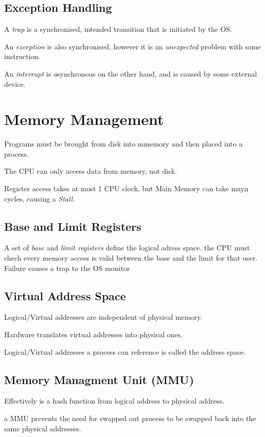 \documentclass{article}
\begin{document}
\subsection{Exception Handling}

A \textit{trap} is a synchronised, intended transition that is initiated by the OS.

An \textit{exception} is also synchronised, however it is an \textit{unexpected} problem with some instruction.

An \textit{interrupt} is \textit{a}synchronous on the other hand, and is caused by some external device.

\filbreak
\section{Memory Management}
Programs must be brought from disk into mmemory and then placed into a process.

The CPU can only access data from memory, not disk.

Register access takes at most 1 CPU clock, but Main Memory can take mayn cycles, causing a \emph{Stall}.

\subsection{Base and Limit Registers}
A set of \emph{base} and \emph{limit registers} define the logical adress space. the CPU must chech every
memory access is valid between the base and the limit for that user. Failure causes a trap to the OS monitor

\subsection{Virtual Address Space}
Logical/Virtual addresses are independent of physical memory.

Hardware translates virtual addresses into physical ones.

Logical/Virtual addresses a process can reference is called the address space.

\subsection{Memory Managment Unit (MMU)}
Effectively is a hash function from logical address to physical address.

a MMU prevents the need for swapped out process to be swapped back into the same physical addresses.
\end{document}
